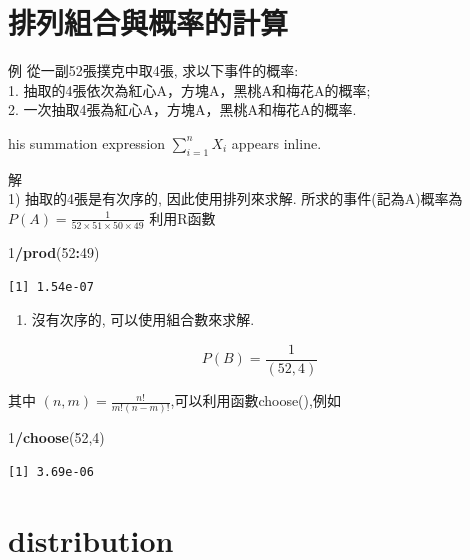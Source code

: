 \documentclass[]{book}
\newenvironment{Shaded}{\begin{snugshade}}{\end{snugshade}}
\newcommand{\DecValTok}[1]{\textcolor[rgb]{0.00,0.00,0.81}{#1}}
\newcommand{\KeywordTok}[1]{\textcolor[rgb]{0.13,0.29,0.53}{\textbf{#1}}}
\newcommand{\NormalTok}[1]{#1}
\newcommand{\OperatorTok}[1]{\textcolor[rgb]{0.81,0.36,0.00}{\textbf{#1}}}
\providecommand{\tightlist}{%
  \setlength{\itemsep}{0pt}\setlength{\parskip}{0pt}}
\theoremstyle{definition}
\theoremstyle{definition}
\theoremstyle{definition}
\theoremstyle{remark}
\begin{document}
\section{排列組合與概率的計算}

例 從一副52張撲克中取4張, 求以下事件的概率:\\
1. 抽取的4張依次為紅心A，方塊A，黑桃A和梅花A的概率;\\
2. 一次抽取4張為紅心A，方塊A，黑桃A和梅花A的概率.

his summation expression \(\sum_{i=1}^n X_i\) appears inline.

解\\
1) 抽取的4張是有次序的, 因此使用排列來求解. 所求的事件(記為A)概率為
\(P(A)=\frac{1}{52 \times 51 \times 50 \times 49}\) 利用R函數

\begin{Shaded}
\begin{Highlighting}[]
\DecValTok{1}\OperatorTok{/}\KeywordTok{prod}\NormalTok{(}\DecValTok{52}\OperatorTok{:}\DecValTok{49}\NormalTok{)}
\end{Highlighting}
\end{Shaded}

\begin{verbatim}
[1] 1.54e-07
\end{verbatim}

\begin{enumerate}
\def\labelenumi{\arabic{enumi}.}
\setcounter{enumi}{1}
\tightlist
\item
  沒有次序的, 可以使用組合數來求解.
\end{enumerate}

\[ P(B)=\frac{1}{(52,4)} \]

其中 \((n,m)=\frac{n!}{m!(n-m)!}\),可以利用函數choose(),例如

\begin{Shaded}
\begin{Highlighting}[]
\DecValTok{1}\OperatorTok{/}\KeywordTok{choose}\NormalTok{(}\DecValTok{52}\NormalTok{,}\DecValTok{4}\NormalTok{)}
\end{Highlighting}
\end{Shaded}

\begin{verbatim}
[1] 3.69e-06
\end{verbatim}

\hypertarget{distribution}{%
\section{distribution}\label{distribution}}
\end{document}
